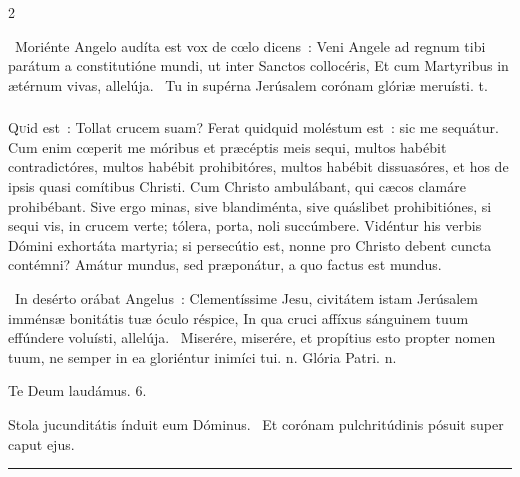 \documentclass[9pt,twoside]{extarticle}
\begin{document}
\begin{multicols}{2}
{{\begin{tightlist}{}
\item {}~Moriénte Angelo audíta est vox de cœlo dicens~: Veni Angele ad regnum tibi parátum a constitutióne mundi, ut inter Sanctos collocéris, \textred{*} Et cum Martyribus in ætérnum vivas, allelúja. ~Tu in supérna Jerúsalem corónam glóriæ meruísti. t.
\end{tightlist}

\subsubsection*{\center {}}
\lettrine{Q}uid est~: Tollat crucem suam? Ferat quidquid moléstum est~: sic me sequátur. Cum enim cœperit me móribus et præcéptis meis sequi, multos habébit contradictóres, multos habébit prohibitóres, multos habébit dissuasóres, et hos de ipsis quasi comítibus Christi. Cum Christo ambulábant, qui cæcos clamáre prohibébant. Sive ergo minas, sive blandiménta, sive quáslibet prohibitiónes, si sequi vis, in crucem verte; tólera, porta, noli succúmbere. Vidéntur his verbis Dómini exhortáta martyria; si persecútio est, nonne pro Christo debent cuncta contémni? Amátur mundus, sed præponátur, a quo factus est mundus. 

\begin{tightlist}{}
\item {}~In desérto orábat Angelus~: Clementíssime Jesu, civitátem istam Jerúsalem imménsæ bonitátis tuæ óculo réspice, \textred{*} In qua cruci affíxus sánguinem tuum effúndere voluísti, allelúja. ~Miserére, miserére, et propítius esto propter nomen tuum, ne semper in ea gloriéntur inimíci tui. n. Glória Patri. n.
\item Te Deum laudámus. 6.
\item {} Stola jucunditátis índuit eum Dóminus. ~Et corónam pulchritúdinis pósuit super caput ejus.
\item {}
\end{tightlist}

\begin{center}\textcolor{red}{\rule{\linewidth}{0.5pt}} \end{center}

\subsubsection*{\center {}}
}}
\end{multicols}
\end{document}
